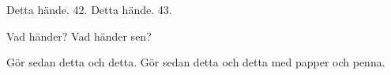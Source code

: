 

\BasicTasks %

\Task 
\Subtask Detta hände. 42.
\Subtask Detta hände. 43.


\Task  
\Subtask Vad händer?
\Subtask Vad händer sen?

\Task Gör sedan detta och detta. 
\Task\Pen Gör sedan detta och detta med papper och penna.

\ExtraTasks %
\lipsum[2]


\AdvancedTasks %
\lipsum[2]
